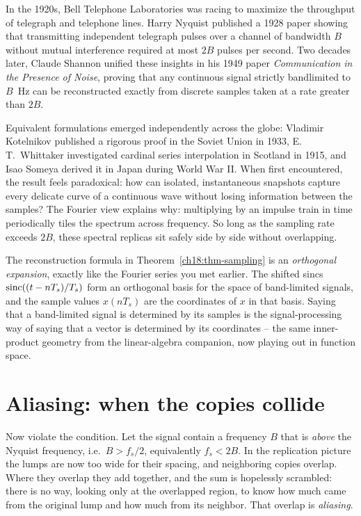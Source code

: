 \begin{historybox}
In the 1920s, Bell Telephone Laboratories was racing to maximize the throughput of telegraph
and telephone lines. Harry Nyquist published a 1928 paper showing that transmitting
independent telegraph pulses over a channel of bandwidth $B$ without mutual interference required
at most $2B$ pulses per second. Two decades later, Claude Shannon unified these insights in his
1949 paper \emph{Communication in the Presence of Noise}, proving that any continuous
signal strictly bandlimited to $B$~Hz can be reconstructed exactly from discrete
samples taken at a rate greater than $2B$.

Equivalent formulations emerged independently across the globe: Vladimir Kotelnikov published a
rigorous proof in the Soviet Union in 1933, E.\,T.\ Whittaker investigated cardinal series interpolation
in Scotland in 1915, and Isao Someya derived it in Japan during World War II. When first encountered,
the result feels paradoxical: how can isolated, instantaneous snapshots capture every delicate curve of
a continuous wave without losing information between the samples? The Fourier view explains
why: multiplying by an impulse train in time periodically tiles the spectrum across frequency.
So long as the sampling rate exceeds $2B$, these spectral replicas sit safely side by side without
overlapping.
\end{historybox}

\begin{connectionbox}
The reconstruction formula in Theorem~\ref{ch18:thm-sampling} is an
\emph{orthogonal expansion}, exactly like the Fourier series you met earlier. The
shifted sincs $\operatorname{sinc}((t-nT_s)/T_s)$ form an orthogonal basis for the space of
band-limited signals, and the sample values $x(nT_s)$ are the coordinates of $x$ in
that basis. Saying that a band-limited signal is determined by its samples is the signal-processing
way of saying that a vector is determined by its coordinates -- the same inner-product
geometry from the linear-algebra companion, now playing out in function space.
\end{connectionbox}

\section{Aliasing: when the copies collide}
\label{ch18:aliasing}

Now violate the condition. Let the signal contain a frequency $B$ that is \emph{above}
the Nyquist frequency, i.e.\ $B > f_s/2$, equivalently $f_s < 2B$. In the replication
picture the lumps are now too wide for their spacing, and neighboring copies overlap.
Where they overlap they add together, and the sum is hopelessly scrambled: there is no
way, looking only at the overlapped region, to know how much came from the original
lump and how much from its neighbor. That overlap is \emph{aliasing}.

